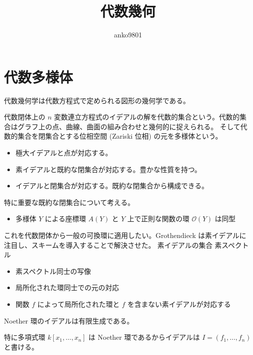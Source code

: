 \documentclass[uplatex,dvipdfmx,a4paper,11pt]{jlreq}
\title{代数幾何}
\author{anko9801}
\numberwithin{equation}{section}
\theoremstyle{definition}
\begin{document}
\maketitle
\tableofcontents
\clearpage

\section{代数多様体}
代数幾何学は代数方程式で定められる図形の幾何学である。

代数閉体上の $n$ 変数連立方程式のイデアルの解を代数的集合という。代数的集合はグラフ上の点、曲線、曲面の組み合わせと幾何的に捉えられる。
そして代数的集合を閉集合とする位相空間 (Zariski 位相) の元を多様体という。
\begin{itemize}
  \item 極大イデアルと点が対応する。
  \item 素イデアルと既約な閉集合が対応する。豊かな性質を持つ。
  \item イデアルと閉集合が対応する。既約な閉集合から構成できる。
\end{itemize}
特に重要な既約な閉集合について考える。
\begin{itemize}
  \item 多様体 $Y$ による座標環 $A(Y)$ と $Y$ 上で正則な関数の環 $\mathcal{O}(Y)$ は同型
\end{itemize}

これを代数閉体から一般の可換環に適用したい。Grothendieck は素イデアルに注目し、スキームを導入することで解決させた。
素イデアルの集合 素スペクトル
\begin{itemize}
  \item 素スペクトル同士の写像
  \item 局所化された環同士での元の対応
  \item 関数 $f$ によって局所化された環と $f$ を含まない素イデアルが対応する
\end{itemize}



\begin{theorem}
  Noether 環のイデアルは有限生成である。

  特に多項式環 $k[x_1,\ldots,x_n]$ は Noether 環であるからイデアルは $I = (f_1,\ldots,f_n)$ と書ける。
\end{theorem}
\end{document}
